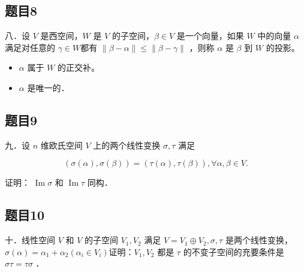 \documentclass{article}
\begin{document}
\subsection{题目8}
八．设 \(V\) 是西空间，\(W\) 是 \(V\) 的子空间，\(\beta \in V\) 是一个向量，如果 \(W\) 中的向量 \(\alpha\) 满足对任意的 \(\gamma \in W\)都有 \(\|\beta-\alpha\| \leq\|\beta-\gamma\|\) ，则称 \(\alpha\) 是 \(\beta\) 到 \(W\) 的投影。

\begin{itemize}
  \item[（1）] \(\alpha\) 属于 \(W\) 的正交补。
  \item[（2）] \(\alpha\) 是唯一的．
\end{itemize}

\subsection{题目9}
九．设 \(n\) 维欧氏空间 \(V\) 上的两个线性变换 \(\sigma, \tau\) 满足

\[
(\sigma(\alpha), \sigma(\beta))=(\tau(\alpha), \tau(\beta)), \forall \alpha, \beta \in V .
\]

证明： \(\operatorname{Im} \sigma\) 和 \(\operatorname{Im} \tau\) 同构．

\subsection{题目10}
十．线性空间 \(V\) 和 \(V\) 的子空间 \(V_{1}, V_{2}\) 满足 \(V=V_{1} \oplus V_{2}, \sigma, \tau\) 是两个线性变换，\(\sigma(\alpha)=\alpha_{1}+\alpha_{2}\left(\alpha_{i} \in V_{i}\right)\)证明：\(V_{1}, V_{2}\) 都是 \(\tau\) 的不变子空间的充要条件是 \(\sigma \tau=\tau \sigma\) ．
\end{document}
